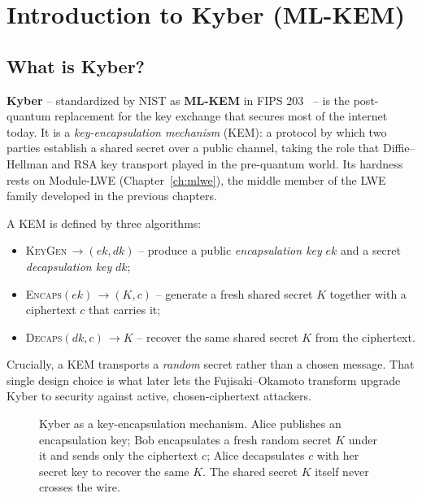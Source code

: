 \chapter{Introduction to Kyber (ML-KEM)}
\label{ch:toymlkem}

\section{What is Kyber?}

\textbf{Kyber} -- standardized by NIST as \textbf{ML-KEM} in FIPS 203~\cite{fips203,kyber2018} -- is the post-quantum replacement for the key exchange that secures most of the internet today. It is a \emph{key-encapsulation mechanism} (KEM): a protocol by which two parties establish a shared secret over a public channel, taking the role that Diffie--Hellman and RSA key transport played in the pre-quantum world. Its hardness rests on Module-LWE (Chapter~\ref{ch:mlwe}), the middle member of the LWE family developed in the previous chapters.

A KEM is defined by three algorithms:

\begin{itemize}
  \item \textsc{KeyGen}\,$\to (ek, dk)$ -- produce a public \emph{encapsulation key} $ek$ and a secret \emph{decapsulation key} $dk$;
  \item \textsc{Encaps}$(ek)\,\to (K, c)$ -- generate a fresh shared secret $K$ together with a ciphertext $c$ that carries it;
  \item \textsc{Decaps}$(dk, c)\,\to K$ -- recover the same shared secret $K$ from the ciphertext.
\end{itemize}

Crucially, a KEM transports a \emph{random} secret rather than a chosen message. That single design choice is what later lets the Fujisaki--Okamoto transform upgrade Kyber to security against active, chosen-ciphertext attackers.

\begin{figure}[H]
\centering
{}
\caption{Kyber as a key-encapsulation mechanism. Alice publishes an encapsulation key; Bob encapsulates a fresh random secret $K$ under it and sends only the ciphertext $c$; Alice decapsulates $c$ with her secret key to recover the same $K$. The shared secret $K$ itself never crosses the wire.}
\label{fig:kyber-kem}
\end{figure}

